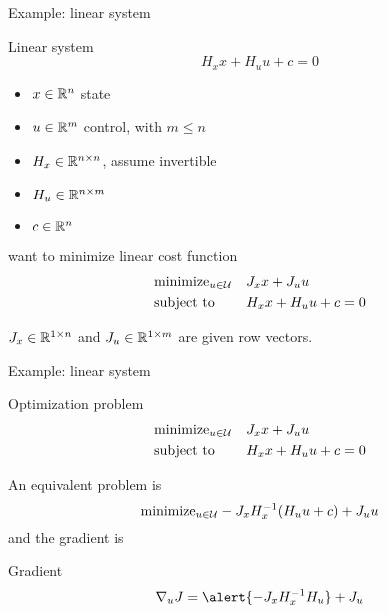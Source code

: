 
\newcommand \xuVector{\left[\begin{array}{c} x \\ u \end{array} \right]}
\begin{frame}{Example: linear system}

\begin{block}{Linear system}
\[
H_x x + H_u u + c = 0
\]
\end{block}

\begin{itemize}
\item $x \in \mathbb{R}^{n}$ state
\item $u \in \mathbb{R}^{m}$ control, with $m \leq n$
\item $H_x \in \mathbb{R}^{n \times n}$, assume invertible
\item $H_u \in \mathbb{R}^{n \times m}$
\item $c \in \mathbb{R}^n$
\end{itemize}

want to minimize linear cost function
\[
\begin{aligned}
&\text{minimize}_{u \in \mathcal{U}} && J_x x + J_u u \\
&\text{subject to} && H_x x + H_u u + c = 0
\end{aligned}
\]

$J_x \in \mathbb{R}^{1\times n}$ and $J_u \in \mathbb{R}^{1 \times m}$ are given row vectors.

\end{frame}


\begin{frame}{Example: linear system}

\begin{block}{Optimization problem}
\[
\begin{aligned}
&\text{minimize}_{u \in \mathcal{U}} && J_x x + J_u u \\
&\text{subject to} && H_x x + H_u u + c = 0
\end{aligned}
\]
\end{block}
An equivalent problem is
\[
\text{minimize}_{u \in \mathcal{U}} - J_x H_x^{-1}(H_u u + c) + J_u u
\]
and the gradient is
\begin{block}{Gradient}
\[
\nabla_u J = \alert{- J_x H_x^{-1} H_u} + J_u
\]
\end{block}

\end{frame}

